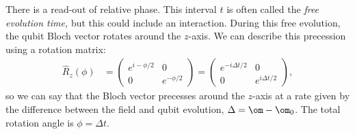 \documentclass[lasers.tex]{subfiles}
\begin{document}
There is a read-out of relative phase. 
This interval $t$ is often called the \emph{free evolution time,} but this could include an interaction. 
During this free evolution, the qubit Bloch vector rotates around the $z$-axis.
We can describe this precession using a rotation matrix:
\begin{align}
    \hat{R}_z(\phi) &= \begin{pmatrix} e^{i-\phi/2} & 0 \\ 0 & e^{-\phi/2} \end{pmatrix} = \begin{pmatrix} e^{-i\Delta t/2} & 0 \\ 0 & e^{i\Delta t/2} \end{pmatrix},
\end{align}
so we can say that the Bloch vector precesses around the $z$-axis at a rate given by the difference between the field and qubit evolution, $\Delta=\om-\om_0$.
The total rotation angle is $\phi=\Delta t$.
\end{document}

